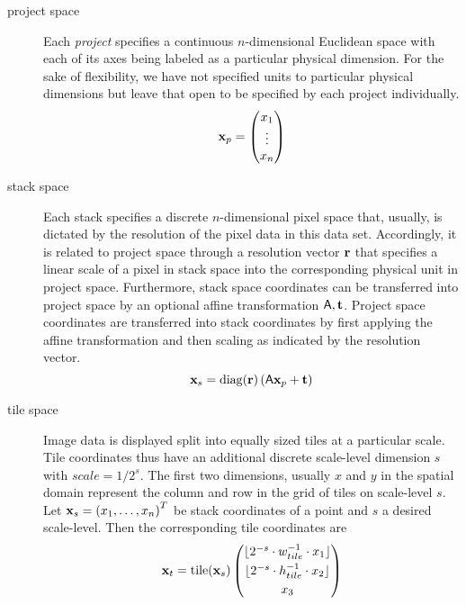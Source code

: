 \documentclass[a4paper,10pt]{article}
\begin{document}
\begin{description}
\item[project space]
  Each \emph{project} specifies a continuous $n$-dimensional Euclidean space with each of its axes being labeled as a particular physical dimension.
  For the sake of flexibility, we have not specified units to particular physical dimensions but leave that open to be specified by each project individually.
  \begin{equation}
    \mathbf{x}_p = \begin{pmatrix}
        x_1 \\ \vdots \\ x_n
      \end{pmatrix}
  \end{equation}
\item[stack space]
  Each stack specifies a discrete $n$-dimensional pixel space that, usually, is dictated by the resolution of the pixel data in this data set.
  Accordingly, it is related to project space through a resolution vector $\mathbf{r}$ that specifies a linear scale of a pixel in stack space into the corresponding physical unit in project space.
  Furthermore, stack space coordinates can be transferred into project space by an optional affine transformation $\mathsf{A}, \mathbf{t}$.
  Project space coordinates are transferred into stack coordinates by first applying the affine transformation and then scaling as indicated by the resolution vector.
  \begin{equation}
    \mathbf{x}_s = \operatorname{diag}(\mathbf{r}) \left( \mathsf{A} \mathbf{x}_p + \mathbf{t} \right)
  \end{equation}
\item[tile space]
  Image data is displayed split into equally sized tiles at a particular scale.
  Tile coordinates thus have an additional discrete scale-level dimension $s$ with $scale = 1/2^s$.
  The first two dimensions, usually $x$ and $y$ in the spatial domain represent the column and row in the grid of tiles on scale-level $s$.
  Let $\mathbf{x}_s = \left( x_1, \dots,  x_n \right)^T$ be stack coordinates of a point and $s$ a desired scale-level.
  Then the corresponding tile coordinates are
  \begin{equation}
    \mathbf{x}_t = \operatorname{tile} (\mathbf{x}_s) \begin{pmatrix}
      \lfloor 2^{-s} \cdot w_{tile}^{-1} \cdot x_1 \rfloor \\[1mm]
      \lfloor 2^{-s} \cdot h_{tile}^{-1} \cdot x_2 \rfloor \\[1mm]
      x_3 \\

\end{pmatrix}
\end{equation}
\end{description}
\end{document}
